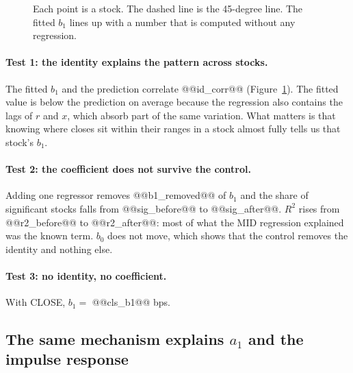 \documentclass[11pt,a4paper]{article}
\begin{document}
\begin{figure}[htbp]
\centering
{}
\caption{Each point is a stock. The dashed line is the 45-degree line. The fitted $b_1$ lines up with a
number that is computed without any regression.}
\label{fig:scatter}
\end{figure}

\paragraph{Test 1: the identity explains the pattern across stocks.} The fitted $b_1$ and the prediction
correlate @@id_corr@@ (Figure~\ref{fig:scatter}). The fitted value is below the prediction on average
because the regression also contains the lags of $r$ and $x$, which absorb part of the same variation.
What matters is that knowing where closes sit within their ranges in a stock almost fully tells us that
stock's $b_1$.

\paragraph{Test 2: the coefficient does not survive the control.} Adding one regressor removes
@@b1_removed@@ of $b_1$ and the share of significant stocks falls from @@sig_before@@ to @@sig_after@@.
$R^2$ rises from @@r2_before@@ to @@r2_after@@: most of what the MID regression explained was the known
term. $b_0$ does not move, which shows that the control removes the identity and nothing else.

\paragraph{Test 3: no identity, no coefficient.} With CLOSE, $b_1 =$ @@cls_b1@@ bps.

\subsection{The same mechanism explains $a_1$ and the impulse response}
\end{document}
